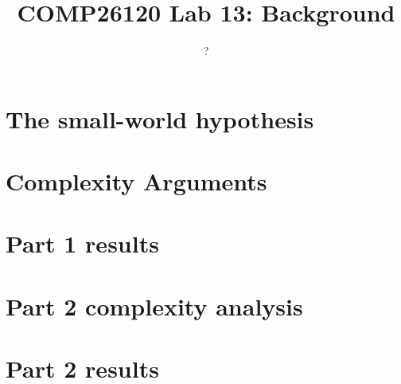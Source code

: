 \documentclass{article}
\title{COMP26120 Lab 13: Background}
\author{?}
\begin{document}
\maketitle


\section{The small-world hypothesis}
\label{sec:small world}


\section{Complexity Arguments}
\label{sec:complexity}


\section{Part 1 results}
\label{sec:part1}



\section{Part 2 complexity analysis}
\label{sec:complexity2}


\section{Part 2 results}
\label{sec:part2}
\end{document}
